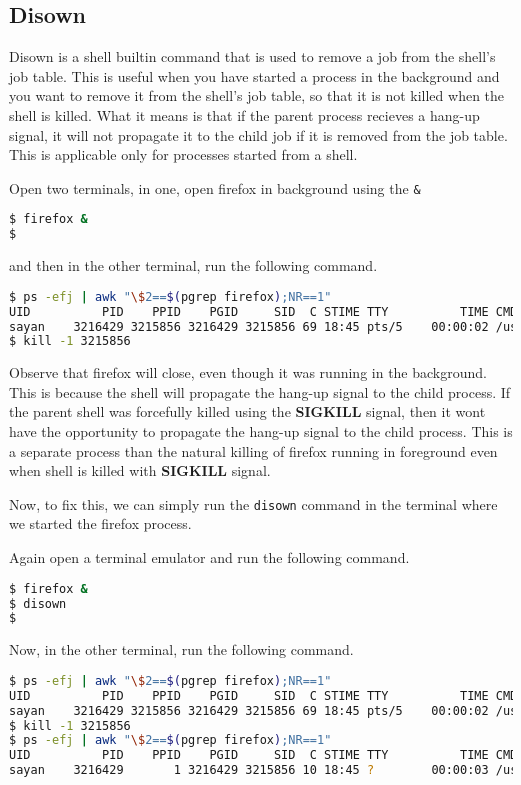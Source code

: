 \subsection{Disown}

Disown is a shell builtin command that is used to remove a job from the shell's
job table. This is useful when you have started a process in the background
and you want to remove it from the shell's job table, so that it is not
killed when the shell is killed. What it means is that if the parent
process recieves a hang-up signal, it will not propagate it to the child
job if it is removed from the job table.
This is applicable only for processes started from a shell.

Open two terminals, in one, open firefox in background using the \texttt{\&}

\begin{lstlisting}[language=bash]
$ firefox &
$
\end{lstlisting}

and then in the other terminal, run the following command.

\begin{lstlisting}[language=bash]
$ ps -efj | awk "\$2==$(pgrep firefox);NR==1"
UID          PID    PPID    PGID     SID  C STIME TTY          TIME CMD
sayan    3216429 3215856 3216429 3215856 69 18:45 pts/5    00:00:02 /usr/lib/firefox/firefox
$ kill -1 3215856
\end{lstlisting}

Observe that firefox will close, even though it was running in the background.
This is because the shell will propagate the hang-up signal to the child process.
If the parent shell was forcefully killed using the \textbf{SIGKILL} signal,
then it wont have the opportunity to propagate the hang-up signal to the child process.
This is a separate process than the natural killing of firefox running in
foreground even when shell is killed with \textbf{SIGKILL} signal.

Now, to fix this, we can simply run the \texttt{disown} command in the terminal
where we started the firefox process.

Again open a terminal emulator and run the following command.

\begin{lstlisting}[language=bash]
$ firefox &
$ disown
$
\end{lstlisting}

Now, in the other terminal, run the following command.

\begin{lstlisting}[language=bash]
$ ps -efj | awk "\$2==$(pgrep firefox);NR==1"
UID          PID    PPID    PGID     SID  C STIME TTY          TIME CMD
sayan    3216429 3215856 3216429 3215856 69 18:45 pts/5    00:00:02 /usr/lib/firefox/firefox
$ kill -1 3215856
$ ps -efj | awk "\$2==$(pgrep firefox);NR==1"
UID          PID    PPID    PGID     SID  C STIME TTY          TIME CMD
sayan    3216429       1 3216429 3215856 10 18:45 ?        00:00:03 /usr/lib/firefox/firefox
\end{lstlisting}

